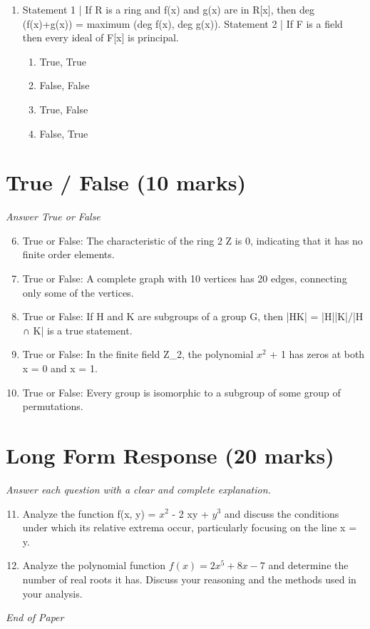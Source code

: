 \documentclass[12pt]{article}
\begin{document}
\begin{enumerate}[label=\arabic*.]
\begin{enumerate}[label=(\alph*)]
    \item 3
\end{enumerate}
\item Statement 1 | If R is a ring and f(x) and g(x) are in R[x], then deg (f(x)+g(x)) = maximum (deg f(x), deg g(x)). Statement 2 | If F is a field then every ideal of F[x] is principal.
\begin{enumerate}[label=(\alph*)]
    \item True, True
    \item False, False
    \item True, False
    \item False, True
\end{enumerate}
\end{enumerate}

\section*{True / False (10 marks)}
\textit{Answer True or False}
\begin{enumerate}[label=\arabic*.]
\setcounter{enumi}{5}
\item True or False: The characteristic of the ring 2 Z is 0, indicating that it has no finite order elements.
\item True or False: A complete graph with 10 vertices has 20 edges, connecting only some of the vertices.
\item True or False: If H and K are subgroups of a group G, then |HK| = |H||K|/|H ∩ K| is a true statement.
\item True or False: In the finite field Z\_2, the polynomial $x^2$ + 1 has zeros at both x = 0 and x = 1.
\item True or False: Every group is isomorphic to a subgroup of some group of permutations.
\end{enumerate}

\section*{Long Form Response (20 marks)}
\textit{Answer each question with a clear and complete explanation.}
\begin{enumerate}[label=\arabic*.]
\setcounter{enumi}{10}
\item Analyze the function f(x, y) = $x^2$ - 2 xy + $y^3$ and discuss the conditions under which its relative extrema occur, particularly focusing on the line x = y.
\item Analyze the polynomial function \( f(x) = 2 x^5 + 8 x - 7 \) and determine the number of real roots it has. Discuss your reasoning and the methods used in your analysis.
\end{enumerate}

\vfill
\noindent\textit{End of Paper}
\end{document}
